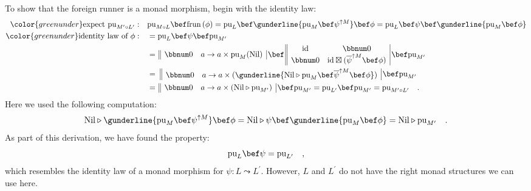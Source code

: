 To show that the foreign runner is a monad morphism, begin with the
identity law:
\begin{align*}
{\color{greenunder}\text{expect }\text{pu}_{M^{\prime}\circ L^{\prime}}:}\quad & \text{pu}_{M\circ L}\bef\text{frun}\,(\phi)=\text{pu}_{L}\bef\gunderline{\text{pu}_{M}\bef\psi^{\uparrow M}}\bef\phi=\text{pu}_{L}\bef\psi\bef\gunderline{\text{pu}_{M}\bef\phi}\\
{\color{greenunder}\text{identity law of }\phi:}\quad & =\text{pu}_{L}\bef\psi\bef\text{pu}_{M^{\prime}}\\
 & =\,\begin{array}{||cc|}
\bbnum 0 & a\rightarrow a\times\text{pu}_{M}(\text{Nil})\end{array}\,\bef\,\begin{array}{||cc|}
\text{id} & \bbnum 0\\
\bbnum 0 & \text{id}\boxtimes(\overline{\psi}^{\uparrow M}\bef\phi)
\end{array}\,\bef\text{pu}_{M^{\prime}}\\
 & =\,\,\begin{array}{||cc|}
\bbnum 0 & a\rightarrow a\times(\gunderline{\text{Nil}\triangleright\text{pu}_{M}\bef\overline{\psi}^{\uparrow M}\bef\phi})\end{array}\,\bef\text{pu}_{M^{\prime}}\\
 & =\,\begin{array}{||cc|}
\bbnum 0 & a\rightarrow a\times(\text{Nil}\triangleright\text{pu}_{M^{\prime}})\end{array}\,\bef\text{pu}_{M^{\prime}}=\text{pu}_{L^{\prime}}\bef\text{pu}_{M^{\prime}}=\text{pu}_{M^{\prime}\circ L^{\prime}}\quad.
\end{align*}
Here we used the following computation:
\[
\text{Nil}\triangleright\gunderline{\text{pu}_{M}\bef\psi^{\uparrow M}}\bef\phi=\text{Nil}\triangleright\psi\bef\gunderline{\text{pu}_{M}\bef\phi}=\text{Nil}\triangleright\text{pu}_{M^{\prime}}\quad.
\]
As part of this derivation, we have found the property:
\begin{equation}
\text{pu}_{L}\bef\psi=\text{pu}_{L^{\prime}}\quad,\label{eq:puL-psi-derivation1}
\end{equation}
which resembles the identity law of a monad morphism for $\psi:L\leadsto L^{\prime}$.
However, $L$ and $L^{\prime}$ do not have the right monad structures
we can use here.

